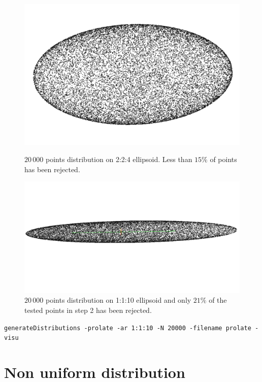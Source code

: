 \documentclass[10pt]{article}
\begin{document}
\begin{figure}[h]
  \centering
  \begin{minipage}{0.45\textwidth}%
   \includegraphics[width=1.0\textwidth]{ellipsoidUnif}
    \caption{$20\,000$ points distribution on 2:2:4 ellipsoid. Less than $15 \%$ of points has been rejected.}%
      \end{minipage}%
  \qquad
  \begin{minipage}{0.45\textwidth}%
   \includegraphics[width=1.2\textwidth]{prolate}
    \caption{$20\,000$ points distribution on 1:1:10 ellipsoid and only $21\%$ of the tested points in step 2 has been rejected.}%
  \end{minipage}%
\end{figure}

\texttt{generateDistributions -prolate -ar 1:1:10   -N 20000 -filename prolate -visu }



\section{Non uniform distribution}
\end{document}
